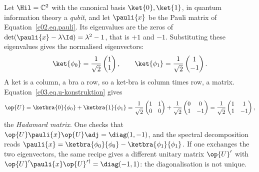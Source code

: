 \begin{example}\label{c03.ex.hadamard}
  Let $\Hil = \mathbb{C}^2$ with the canonical basis $\ket{0}, \ket{1}$, in quantum information
  theory a \emph{qubit}, and let $\pauli{x}$ be the Pauli matrix of
  Equation~\eqref{c02.eq.pauli}. Its eigenvalues are the zeros of
  $\det(\pauli{x} - \lambda\Id) = \lambda^2 - 1$, that is $+1$ and $-1$. Substituting these eigenvalues gives the
  normalised eigenvectors:
  \begin{equation}\label{c03.eq.hadamard-eigen}
    \ket{\phi_0} = \frac{1}{\sqrt{2}} \begin{pmatrix} 1 \\ 1 \end{pmatrix} ,
    \qquad
    \ket{\phi_1} = \frac{1}{\sqrt{2}} \begin{pmatrix} 1 \\ -1 \end{pmatrix} .
  \end{equation}
  A ket is a column, a bra a row, so a ket-bra is column times row, a matrix.
  Equation~\eqref{c03.eq.u-konstruktion} gives
  \begin{equation}\label{c03.eq.hadamard}
    \op{U}
    = \ketbra{0}{\phi_0} + \ketbra{1}{\phi_1}
    = \frac{1}{\sqrt{2}} \begin{pmatrix} 1 & 1 \\ 0 & 0 \end{pmatrix}
    + \frac{1}{\sqrt{2}} \begin{pmatrix} 0 & 0 \\ 1 & -1 \end{pmatrix}
    = \frac{1}{\sqrt{2}} \begin{pmatrix} 1 & 1 \\ 1 & -1 \end{pmatrix} ,
  \end{equation}
  the \emph{Hadamard matrix}. One checks that $\op{U}\pauli{x}\op{U}\adj = \diag(1, -1)$, and
  the spectral decomposition reads
  $\pauli{x} = \ketbra{\phi_0}{\phi_0} - \ketbra{\phi_1}{\phi_1}$. If one exchanges the two
  eigenvectors, the same recipe gives a different unitary matrix $\op{U}'$ with
  $\op{U}'\pauli{x}\op{U}'^{\dagger} = \diag(-1, 1)$: the diagonalisation is not unique.
\end{example}

